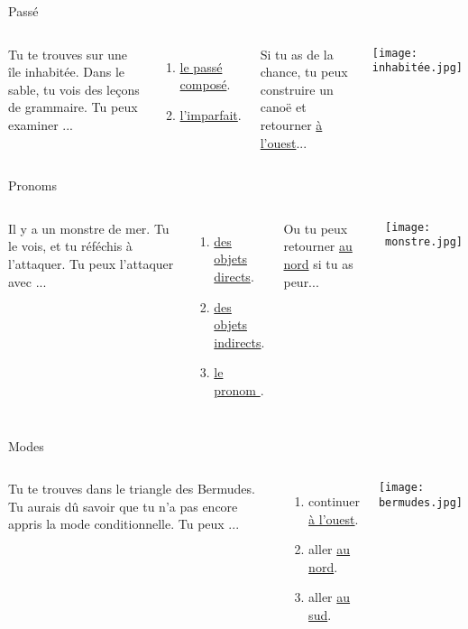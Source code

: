 \documentclass{beamer}
\begin{document}
  \begin{frame}{Passé}
    \hypertarget{passé}{}
    \begin{columns}
        Tu te trouves sur une île inhabitée.
        Dans le sable, tu vois des leçons de grammaire.
        Tu peux examiner ...
        \begin{enumerate}
          \item \hyperlink{composé}{le passé composé}.
          \item \hyperlink{imparfait}{l'imparfait}.
        \end{enumerate}
        Si tu as de la chance, tu peux construire un canoë et retourner \hyperlink{mort}{à l'ouest}...
        \begin{center}
          \texttt{[image: inhabitée.jpg]}
        \end{center}
    \end{columns}
  \end{frame}

  \begin{frame}{}
    \hypertarget{pronoms}{Pronoms}
    \begin{columns}
        Il y a un monstre de mer.
        Tu le vois, et tu réféchis à l'attaquer.
        Tu peux l'attaquer avec ...
        \begin{enumerate}
          \item \hyperlink{direct}{des objets directs}.
          \item \hyperlink{indirect}{des objets indirects}.
          \item \hyperlink{y}{le pronom }.
        \end{enumerate}
        Ou tu peux retourner \hyperlink{début}{au nord} si tu as peur...
        \begin{center}
          \texttt{[image: monstre.jpg]}
        \end{center}
    \end{columns}
  \end{frame}

  \begin{frame}{Modes}
    \hypertarget{modes}{}
    \begin{columns}
        Tu te trouves dans le triangle des Bermudes.
        Tu \alert{aurais} dû savoir que tu n'a pas encore appris la mode conditionnelle.
        Tu peux ...
        \begin{enumerate}
          \item continuer \hyperlink{mort}{à l'ouest}.
          \item aller \hyperlink{questions}{au nord}.
          \item aller \hyperlink{pronoms}{au sud}.
        \end{enumerate}
        \begin{center}
          \texttt{[image: bermudes.jpg]}
        \end{center}
    \end{columns}
  \end{frame}
\end{document}
